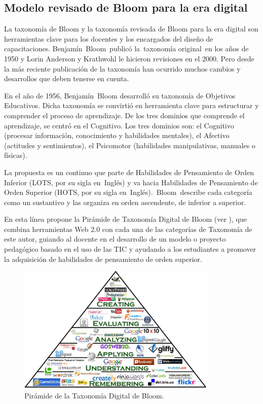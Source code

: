 \documentclass[spanish]{textolivre}
\begin{document}
\subsection{Modelo revisado de Bloom para la era digital}\label{sec-formato}
La taxonomía de Bloom y la taxonomía revisada de Bloom para la era digital son herramientas clave para los docentes y los encargados del diseño de capacitaciones. Benjamín Bloom publicó la taxonomía original en los años de 1950 y Lorin Anderson y Krathwohl le hicieron revisiones en el 2000. Pero desde la más reciente publicación de la taxonomía han ocurrido muchos cambios y desarrollos que deben tenerse en cuenta.

En el año de 1956, Benjamín Bloom desarrolló su taxonomía de Objetivos Educativos. Dicha taxonomía se convirtió en herramienta clave para estructurar y comprender el proceso de aprendizaje. De los tres dominios que comprende el aprendizaje, se centró en el Cognitivo. Los tres dominios son: el Cognitivo (procesar información, conocimiento y habilidades mentales), el Afectivo (actitudes y sentimientos), el Psicomotor (habilidades manipulativas, manuales o físicas). 

La propuesta es un continuo que parte de Habilidades de Pensamiento de Orden Inferior (LOTS, por su sigla en Inglés) y va hacia Habilidades de Pensamiento de Orden Superior (HOTS, por su sigla en Inglés). Bloom describe cada categoría como un sustantivo y las organiza en orden ascendente, de inferior a superior.

En esta línea \textcite{penny_blooms_2015} propone la Pirámide de Taxonomía Digital de Bloom (ver ), que combina herramientas Web 2.0 con cada una de las categorías de Taxonomía de este autor, guiando al docente en el desarrollo de un modelo o proyecto pedagógico basado en el uso de las TIC y ayudando a los estudiantes a promover la adquisición de habilidades de pensamiento de orden superior.

\begin{figure}[h!]
 \centering
 \includegraphics[width=0.85\textwidth]{Fig1.png}
 \caption{Pirámide de la Taxonomía Digital de Bloom.}
 \label{fig01}
\end{figure}
\end{document}
